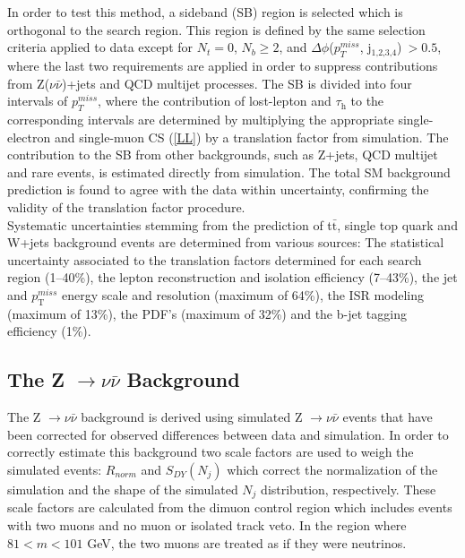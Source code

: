 In order to test this method, a sideband (SB) region is selected which is orthogonal to the search region. This region is defined by the same selection criteria applied to data except for $N_t = 0$, $N_b \geq 2$, and $\Delta\phi$($p_{T}^{miss}$,  j$_\text{1,2,3,4}$)$~> 0.5$, where the last two requirements are applied in order to suppress contributions from Z($\nu\bar{\nu}$)+jets and QCD multijet processes. The SB is divided into four intervals of $p_{T}^{miss}$, where the contribution of lost-lepton and $\tau_\text{h}$ to the corresponding intervals are determined by multiplying the appropriate single-electron and single-muon CS (\autoref{LL}) by a translation factor from simulation. The contribution to the SB from other backgrounds, such as Z+jets, QCD multijet and rare events, is estimated directly from simulation. The total SM background prediction is found to agree with the data within uncertainty, confirming the validity of the translation factor procedure.\\

Systematic uncertainties stemming from the prediction of t$\bar{\text{t}}$, single top quark and W+jets background events are determined from various sources: The statistical uncertainty associated to the translation factors determined for each search region (1--40\%), the lepton reconstruction and isolation efficiency (7--43\%), the jet and $p_{\text{T}}^{miss}$ energy scale and resolution (maximum of 64\%), the ISR modeling (maximum of 13\%), the PDF's (maximum of 32\%) and the b-jet tagging efficiency (1\%).

\subsection{The Z $\rightarrow\nu\bar{\nu}$ Background}

The Z $\rightarrow\nu\bar{\nu}$ background is derived using simulated Z $\rightarrow\nu\bar{\nu}$ events that have been corrected for observed differences between data and simulation. In order to correctly estimate this background two scale factors are used to weigh the simulated events: $R_{norm}$ and $S_{DY}( N_j)$  which correct the normalization of the simulation and the shape of the simulated $N_j$ distribution, respectively. These scale factors are calculated from the dimuon control region which includes events with two muons and no muon or isolated track veto. In the region where $81 < m < 101$ GeV, the two muons are treated as if they were neutrinos.\\

